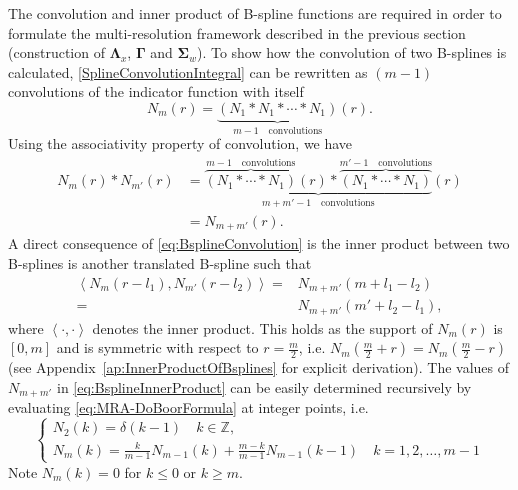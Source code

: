 \documentclass[review,authoryear,3p]{elsarticle}
\begin{document}
The convolution and inner product of B-spline functions are required in order to formulate the multi-resolution framework described in the previous section (construction of $\boldsymbol\Lambda_{x}$, $\boldsymbol\Gamma$ and $\boldsymbol\Sigma_w$). To show how the convolution of two B-splines is calculated, \eqref{SplineConvolutionIntegral} can be rewritten as $(m-1)$ convolutions of the indicator function with itself
\begin{equation}\label{eq:N1convolutions}
 N_{m}\left(r\right)=\underbrace{\left(N_{1}\ast N_{1}\ast \cdots \ast N_{1}\right)}_{m-1\quad \text{convolutions}}\left(r\right).
\end{equation}
Using the associativity property of convolution, we have
\setlength{\arraycolsep}{0.0em}
\begin{align}\label{eq:BsplineConvolution}
N_{m}\left( r\right) \ast N_{m'}\left(r\right)&=\underbrace{\overbrace{\left(N_{1} \ast \cdots \ast N_{1}\right)}^{m-1 \quad \text{convolutions}}\left(r\right) \ast \overbrace{\left(N_{1} \ast \cdots \ast N_{1}\right)}^{m'-1\quad \text{convolutions}}}_{m+m'-1 \quad \text{convolutions}}\left(r\right)\nonumber\\
&=N_{m+m'}\left(r\right).
\end{align}
A direct consequence of \eqref{eq:BsplineConvolution} is the inner product between two B-splines is another translated B-spline such that
\begin{align}
 \left\langle N_{m}\left(r-l_{1}\right), N_{m'}\left(r-l_{2}\right)\right\rangle=&N_{m+m'}\left(m+l_{1}-l_{2}\right)\nonumber \\
=&N_{m+m'}\left(m'+l_{2}-l_{1}\right),
\label{eq:BsplineInnerProduct}
\end{align}
where $\left\langle \cdot,\cdot\right\rangle $ denotes the inner product. This holds as the support of $N_m\left(r\right)$ is $\left[ 0,m\right]$ and  is symmetric with respect to $r=\frac{m}{2}$, i.e. $ N_{m}\left(\frac{m}{2}+r\right)=N_{m}\left(\frac{m}{2}-r\right)$ (see Appendix~\ref{ap:InnerProductOfBsplines} for explicit derivation). The values of $N_{m+m'}$ in \eqref{eq:BsplineInnerProduct} can be easily determined recursively by evaluating \eqref{eq:MRA-DoBoorFormula} at integer points, i.e.
 \begin{equation}\label{eq:MRA-recursiveBsplineatintegerpoints}
 \begin{cases}
 N_2(k)=\delta(k-1)\quad k\in \mathbb{Z}, \\
 N_{m}\left(k\right)=\frac{k}{m-1}N_{m-1}\left(k\right)+\frac{m-k}{m-1}N_{m-1}\left(k-1\right) \quad k=1,2,\dots,m-1
  \end{cases}
 \end{equation}
Note $N_{m}\left(k\right)=0$ for $k\le0$ or $k\ge m$. 
\end{document}
